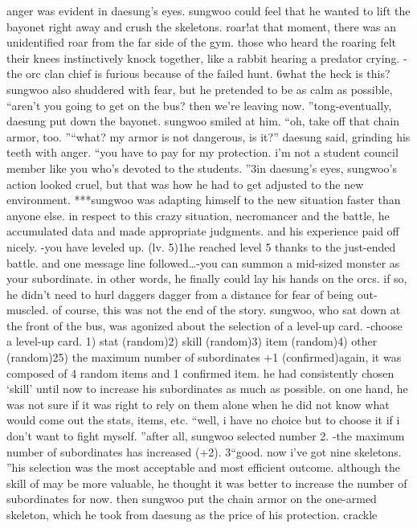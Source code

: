 anger was evident in daesung’s eyes.
 sungwoo could feel that he wanted to lift the bayonet right away and crush the skeletons.
roar!at that moment, there was an unidentified roar from the far side of the gym.
 those who heard the roaring felt their knees instinctively knock together, like a rabbit hearing a predator crying.
-the orc clan chief is furious because of the failed hunt.
6what the heck is this? sungwoo also shuddered with fear, but he pretended to be as calm as possible, “aren’t you going to get on the bus? then we’re leaving now.
”tong-eventually, daesung put down the bayonet.
 sungwoo smiled at him.
“oh, take off that chain armor, too.
”“what? my armor is not dangerous, is it?” daesung said, grinding his teeth with anger.
“you have to pay for my protection.
 i’m not a student council member like you who’s devoted to the students.
”3in daesung’s eyes, sungwoo’s action looked cruel, but that was how he had to get adjusted to the new environment.
***sungwoo was adapting himself to the new situation faster than anyone else.
in respect to this crazy situation, necromancer and the battle, he accumulated data and made appropriate judgments.
 and his experience paid off nicely.
-you have leveled up.
 (lv.
 5)1he reached level 5 thanks to the just-ended battle.
and one message line followed…-you can summon a mid-sized monster as your subordinate.
in other words, he finally could lay his hands on the orcs.
 if so, he didn’t need to hurl daggers dagger from a distance for fear of being out-muscled.
of course, this was not the end of the story.
 sungwoo, who sat down at the front of the bus, was agonized about the selection of a level-up card.
-choose a level-up card.
1) stat (random)2) skill (random)3) item (random)4) other (random)25) the maximum number of subordinates +1 (confirmed)again, it was composed of 4 random items and 1 confirmed item.
he had consistently chosen ‘skill’ until now to increase his subordinates as much as possible.
on one hand, he was not sure if it was right to rely on them alone when he did not know what would come out the stats, items, etc.
“well, i have no choice but to choose it if i don’t want to fight myself.
”after all, sungwoo selected number 2.
-the maximum number of subordinates has increased (+2).
3“good.
 now i’ve got nine skeletons.
”his selection was the most acceptable and most efficient outcome.
 although the skill of  may be more valuable, he thought it was better to increase the number of subordinates for now.
then sungwoo put the chain armor on the one-armed skeleton, which he took from daesung as the price of his protection.
crackle

